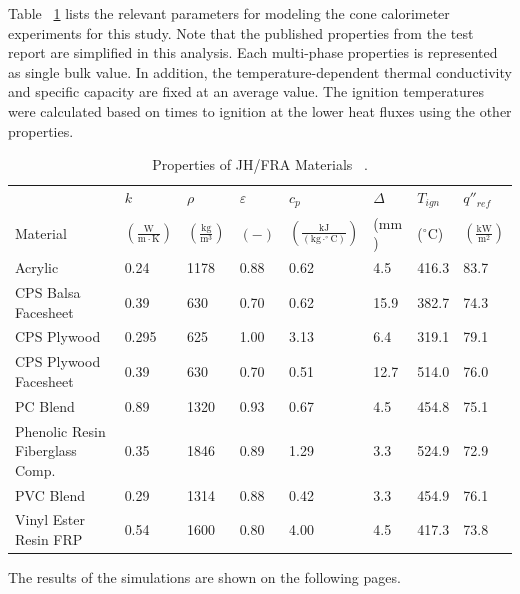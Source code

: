 Table ~\ref{Properties_JH_FRA_Materials} lists the relevant parameters for modeling the cone calorimeter experiments for this study.
Note that the published properties from the test report are simplified in this analysis. Each multi-phase properties is represented as single bulk value.
In addition, the temperature-dependent thermal conductivity and specific capacity are fixed at an average value.
The ignition temperatures were calculated based on times to ignition at the lower heat fluxes using the other properties.

\begin{table}[!h]
\caption[Properties of JH/FRA Materials]{Properties of JH/FRA Materials ~\cite{Luo:FRA2019}.}
\centering
\begin{tabular}{|p{5.5cm}|p{1.0cm}|p{1.0cm}|p{0.8cm}|p{1.4cm}|p{1.0cm}|p{1.0cm}|p{1.2cm}|}
\hline
                                               & $k$    & $\rho$      & $\varepsilon$   & $c_{p}$ & $\Delta$    & $T_{ign}$ & $q''_{ref}$ \\
Material                                       & $\mathrm{\left(\frac{W}{m\cdot K}\right)}$ & $\mathrm{\left(\frac{kg}{m^{3}}\right)}$ & $\mathrm{( - )}$ & $\mathrm{\left(\frac{kJ}{(kg\cdot ^{\circ}C)}\right)}$ &  ($\mathrm{mm}$)   & ($\mathrm{^{\circ}C}$) & $\mathrm{\left(\frac{kW}{m^{2}}\right)}$ \\ \hline
\hline
Acrylic & 0.24 & 1178 & 0.88 & 0.62 & 4.5 & 416.3 & 83.7 \\ \hline
CPS Balsa Facesheet & 0.39 & 630 & 0.70 & 0.62 & 15.9 & 382.7 & 74.3 \\ \hline
CPS Plywood & 0.295 & 625 & 1.00 & 3.13 & 6.4 & 319.1 & 79.1 \\ \hline
CPS Plywood Facesheet & 0.39 & 630 & 0.70 & 0.51 & 12.7 & 514.0 & 76.0 \\ \hline
PC Blend & 0.89 & 1320 & 0.93 & 0.67 & 4.5 & 454.8 & 75.1 \\ \hline
Phenolic Resin Fiberglass Comp. & 0.35 & 1846 & 0.89 & 1.29 & 3.3 & 524.9 & 72.9 \\ \hline
PVC Blend & 0.29 & 1314 & 0.88 & 0.42 & 3.3 & 454.9 & 76.1 \\ \hline
Vinyl Ester Resin FRP & 0.54 & 1600 & 0.80 & 4.00 & 4.5 & 417.3 & 73.8 \\ \hline
\end{tabular}
\label{Properties_JH_FRA_Materials}
\end{table}

The results of the simulations are shown on the following pages.

